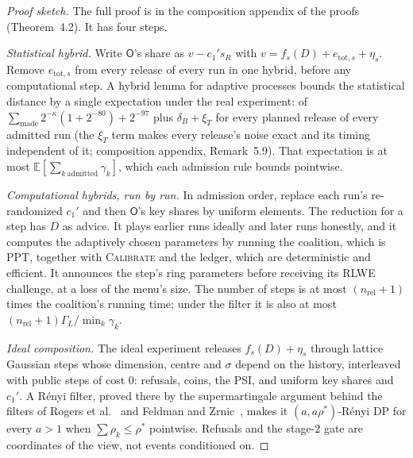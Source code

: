 \documentclass[11pt]{article}
\theoremstyle{definition}
\theoremstyle{plain}
\newcommand{\E}{\mathbb{E}}
\newcommand{\Party}[1]{\textsf{#1}}
\newcommand{\Op}{\Party{O}}
\begin{document}
\begin{proof}[Proof sketch]
The full proof is in the composition appendix of the proofs (Theorem~4.2). It has four steps.

\emph{Statistical hybrid.} Write $\Op$'s share as $v - c_1's_R$ with $v = f_s(D) + e_{\mathrm{tot},s} + \eta_s$. Remove $e_{\mathrm{tot},s}$ from every release of every run in one hybrid, before any computational step. A hybrid lemma for adaptive processes bounds the statistical distance by a single expectation under the real experiment: of $\sum_{\mathrm{made}}2^{-\kappa}(1 + 2^{-80}) + 2^{-97}$ plus $\delta_B + \xi_T$ for every planned release of every admitted run (the $\xi_T$ term makes every release's noise exact and its timing independent of it; composition appendix, Remark~5.9). That expectation is at most $\E[\sum_{k\ \mathrm{admitted}}\gamma_k]$, which each admission rule bounds pointwise.

\emph{Computational hybrids, run by run.} In admission order, replace each run's re-randomized $c_1'$ and then $\Op$'s key shares by uniform elements. The reduction for a step has $D$ as advice. It plays earlier runs ideally and later runs honestly, and it computes the adaptively chosen parameters by running the coalition, which is PPT, together with \textsc{Calibrate} and the ledger, which are deterministic and efficient. It announces the step's ring parameters before receiving its RLWE challenge, at a loss of the menu's size. The number of steps is at most $(n_{\mathrm{rel}} + 1)$ times the coalition's running time; under the filter it is also at most $(n_{\mathrm{rel}} + 1)\Gamma_L/\min_k\gamma_k$.

\emph{Ideal composition.} The ideal experiment releases $f_s(D) + \eta_s$ through lattice Gaussian steps whose dimension, centre and $\sigma$ depend on the history, interleaved with public steps of cost $0$: refusals, coins, the PSI, and uniform key shares and $c_1'$. A R\'enyi filter, proved there by the supermartingale argument behind the filters of Rogers et al.~\cite{rogers2016odometers} and Feldman and Zrnic~\cite{feldman2021individual}, makes it $(a, a\rho^*)$-R\'enyi DP for every $a > 1$ when $\sum\rho_k \le \rho^*$ pointwise. Refusals and the stage-2 gate are coordinates of the view, not events conditioned on.


\end{proof}
\end{document}
